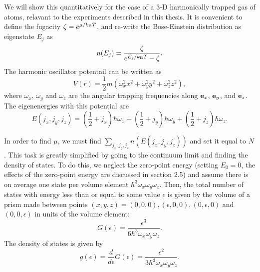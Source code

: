 We will show this quantitatively for the case of a 3-D harmonically trapped gas of atoms, relavant to the experiments described in this thesis. It is convenient to define the fugacity $\zeta=e^{\mu/k_{\rm B}T}$, and re-write the Bose-Einstein distribution as 
eigenstate $E_j$ as
\begin{equation}
n(E_j) = \frac{\zeta}{e^{E_j/k_{\rm B}T}-\zeta}.
\end{equation}
The harmonic oscillator potentail can be written as 
\begin{equation}
V(r) = \frac{1}{2} m (\omega_x^2 x^2 + \omega_y^2 y^2 + \omega_z^2 z^2),
\end{equation}
where $\omega_x$, $\omega_y$ and $\omega_z$ are the angular trapping frequencies along ${\bf e}_x$, ${\bf e}_y$, and ${\bf e}_z$.  The eigenenergies with this potential are
\begin{equation}
E(j_x,j_y,j_z) = (\frac{1}{2} + j_x)\hbar\omega_x +(\frac{1}{2} + j_y)\hbar\omega_y+(\frac{1}{2} + j_z)\hbar\omega_z.
\end{equation}

In order to find $\mu$, we must find $\sum_{j_x,j_y,j_z}n(E(j_x,j_y,j_z))$ and set it equal to $N$. This task is greatly simplified by going to the continuum limit and finding the density of states. To do this, we neglect the zero-point energy (setting $E_0=0$, the effects of the zero-point energy are discussed in \cite{Pethick} section 2.5)  and assume there is on average one state per volume element $\hbar^3 \omega_x \omega_y \omega_z$. Then, the total number of states with energy less than or equal to some value $\epsilon$ is given by the volume of a prism made between points $(x,y,z)=(0,0,0),(\epsilon,0,0),(0,\epsilon,0)$ and $(0,0,\epsilon)$ in units of the volume element:
\begin{equation}
G(\epsilon) = \frac{\epsilon^3}{6\hbar^3\omega_x \omega_y \omega_z}.
\end{equation}
The density of states is given by 
\begin{equation}
g(\epsilon) = \frac{d}{d\epsilon} G(\epsilon) = \frac{\epsilon^2}{3\hbar^3\omega_x \omega_y \omega_z}. 
\end{equation}

